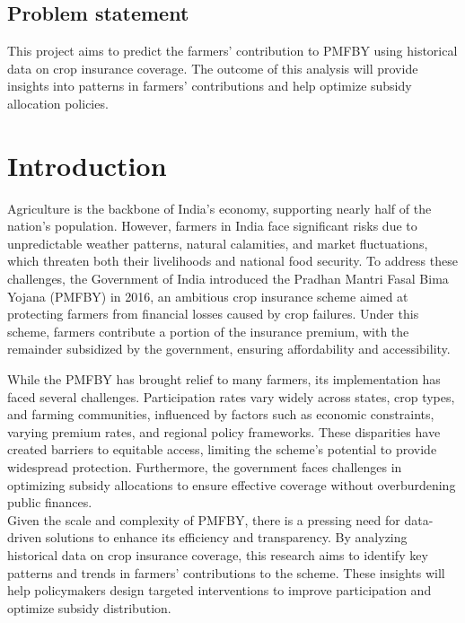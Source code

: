 \documentclass[12pt]{article}
\begin{document}
\subsection{Problem statement}
This project aims to predict the farmers' contribution to PMFBY using historical data on crop insurance coverage. The outcome of this analysis will provide insights into 
patterns in farmers' contributions and help optimize subsidy allocation policies. 

\section{Introduction}
Agriculture is the backbone of India’s economy, supporting nearly half of the nation’s population. However, farmers in India face significant risks due to unpredictable 
weather patterns, natural calamities, and market fluctuations, which threaten both their livelihoods and national food security. To address these challenges, the 
Government of India introduced the Pradhan Mantri Fasal Bima Yojana (PMFBY) in 2016, an ambitious crop insurance scheme aimed at protecting farmers from 
financial losses caused by crop failures. Under this scheme, farmers contribute a portion of the insurance premium, with the remainder subsidized by the government, ensuring affordability and accessibility.

\vspace{5pt}
While the PMFBY has brought relief to many farmers, its implementation has faced several challenges. Participation rates vary widely across states, crop types, 
and farming communities, influenced by factors such as economic constraints, varying premium rates, and regional policy frameworks. These disparities have 
created barriers to equitable access, limiting the scheme's potential to provide widespread protection. Furthermore, the government faces challenges in optimizing
 subsidy allocations to ensure effective coverage without overburdening public finances.\\
Given the scale and complexity of PMFBY, there is a pressing need for data-driven solutions to enhance its efficiency and transparency. By analyzing historical data 
on crop insurance coverage, this research aims to identify key patterns and trends in farmers' contributions to the scheme. These insights will help policymakers
 design targeted interventions to improve participation and optimize subsidy distribution.
\end{document}
